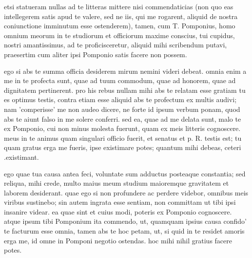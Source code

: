 


 etsi statueram nullas ad te litteras mittere nisi commendaticias (non quo eas intellegerem satis apud te valere, sed ne iis, qui me rogarent, aliquid de nostra coniunctione imminutum esse ostenderem), tamen, cum T. Pomponius, homo omnium meorum in te studiorum et officiorum maxime conscius, tui cupidus, nostri amantissimus, ad te proficisceretur, aliquid mihi scribendum putavi, praesertim cum aliter ipsi Pomponio satis facere non possem.

 ego si abs te summa officia desiderem mirum nemini videri debeat. omnia enim a me in te profecta sunt, quae ad tuum commodum, quae ad honorem, quae ad dignitatem pertinerent. pro his rebus nullam mihi abs te relatam esse gratiam tu es optimus testis, contra etiam esse aliquid abs te profectum ex multis audivi; nam 'comperisse' me non audeo dicere, ne forte id ipsum verbum ponam, quod abs te aiunt falso in me solere conferri. sed ea, quae ad me delata sunt, malo te ex Pomponio, cui non minus molesta fuerunt, quam ex meis litteris cognoscere. meus in te animus quam singulari officio fuerit, et senatus et p. R. testis est; tu quam gratus erga me fueris, ipse existimare potes; quantum mihi debeas, ceteri .existimant.

 ego quae tua causa antea feci, voluntate sum adductus posteaque constantia; sed reliqua, mihi crede, multo maius meum studium maioremque gravitatem et laborem desiderant. quae ego si non profundere ac perdere videbor, omnibus meis viribus sustinebo; sin autem ingrata esse sentiam, non committam ut tibi ipsi insanire videar. ea quae sint et cuius modi, poteris ex Pomponio cognoscere. atque ipsum tibi Pomponium ita commendo, ut, quamquam ipsius causa confido' te facturum esse omnia, tamen abs te hoc petam, ut, si quid in te residet amoris erga me, id omne in Pomponi negotio ostendas. hoc mihi nihil gratius facere potes.

